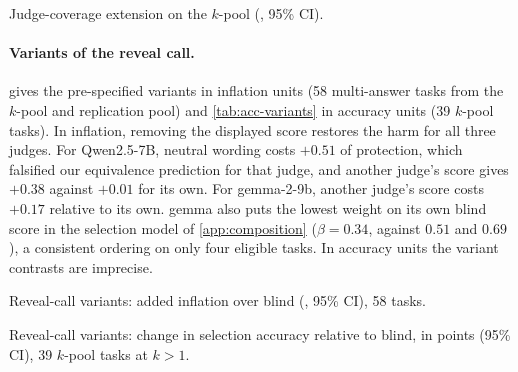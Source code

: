 \begin{table}[htbp]
\centering
\caption{Judge-coverage extension on the $k$-pool (\sd, 95\% CI).\osf}
\label{tab:coverage}
\scriptsize
\setlength{\tabcolsep}{3pt}
\begin{adjustbox}{max width=\linewidth}\end{adjustbox}

\end{table}

\paragraph{Variants of the reveal call.}
 gives the pre-specified variants in inflation units (58 multi-answer tasks from the $k$-pool and replication pool) and \cref{tab:acc-variants} in accuracy units (39 $k$-pool tasks). In inflation, removing the displayed score restores the harm for all three judges. For Qwen2.5-7B, neutral wording costs $+0.51$  of protection, which falsified our equivalence prediction for that judge, and another judge's score gives $+0.38$ against $+0.01$ for its own. For gemma-2-9b, another judge's score costs $+0.17$  relative to its own. gemma also puts the lowest weight on its own blind score in the selection model of \cref{app:composition} ($\beta = 0.34$, against $0.51$ and $0.69$), a consistent ordering on only four eligible tasks. In accuracy units the variant contrasts are imprecise.

\begin{table}[htbp]
\centering
\caption{Reveal-call variants: added inflation over blind (\sd, 95\% CI), 58 tasks.\pre}
\label{tab:m1variants}
\footnotesize
\setlength{\tabcolsep}{3pt}
\begin{adjustbox}{max width=\linewidth}\end{adjustbox}

\end{table}

\begin{table}[htbp]
\centering
\caption{Reveal-call variants: change in selection accuracy relative to blind, in points (95\% CI), 39 $k$-pool tasks at $k{>}1$.\ph}
\label{tab:acc-variants}
\footnotesize
\setlength{\tabcolsep}{3pt}
\begin{adjustbox}{max width=\linewidth}\end{adjustbox}

\end{table}

